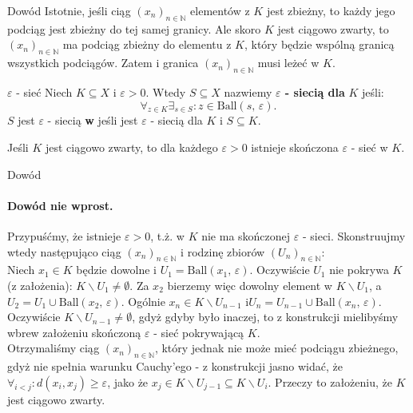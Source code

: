 \documentclass{article}
\numberwithin{defi}{section}
\numberwithin{defi}{section}
\newcommand{\N}{\mathbb{N}}
\providecommand{\eps}{\varepsilon}
\newcommand{\ciag}[1]{(#1_{n})_{n \in \N}}
\newcommand{\ball}[2]{\text{Ball}(#1, \, #2)}
\begin{document}
    \begin{dow}{Dowód}
        Istotnie, jeśli ciąg $\ciag{x}$ elementów z $K$ jest zbieżny, to każdy jego podciąg jest zbieżny do tej samej granicy. Ale skoro $K$ jest ciągowo zwarty, to $\ciag{x}$ ma podciąg zbieżny do elementu z $K$, który będzie wspólną granicą wszystkich podciągów. Zatem i granica $\ciag{x}$ musi leżeć w $K$. 
    \end{dow}


    \begin{defr}{$\eps$ - sieć} \label{defr:eps-siec}
        Niech $K \subseteq X$ i $\eps > 0$. Wtedy $S \subseteq X$ nazwiemy \textbf{$\eps$ - siecią dla} $K$ jeśli: \begin{equation}
            \forall_{z \in K} \exists_{s \in S}: z \in \ball{s}{\eps}.
        \end{equation} $S$ jest $\eps$ - siecią \textbf{w} jeśli jest $\eps$ - siecią dla $K$ i $S \subseteq K$.
    \end{defr}


    \begin{twier}{}\label{twier:sk-eps-siec}
        Jeśli $K$ jest ciągowo zwarty, to dla każdego $\eps > 0$ istnieje skończona $\eps$ - sieć w $K$.
    \end{twier}

    \begin{dow}{Dowód}
        \paragraph{Dowód nie wprost.} Przypuśćmy, że istnieje $\eps > 0$, t.ż. w $K$ nie ma skończonej $\eps$ - sieci. Skonstruujmy wtedy następująco ciąg $\ciag{x}$ i rodzinę zbiorów $\ciag{U}$:\\
         Niech $x_1 \in K$ będzie dowolne i $U_1 = \ball{x_1}{\eps}$. Oczywiście $U_1$ nie pokrywa $K$ (z założenia): $K \backslash U_1 \neq \emptyset$. Za $x_2$ bierzemy więc dowolny element w $K \backslash U_1$, a $U_2 = U_1 \cup \ball{x_2}{\eps}$. Ogólnie $x_n \in K \backslash U_{n-1}$ i$U_n = U_{n-1} \cup \ball{x_{n}}{\eps}$. Oczywiście $K \backslash U_{n-1} \neq \emptyset$, gdyż gdyby było inaczej, to z konstrukcji mielibyśmy wbrew założeniu skończoną $\eps$ - sieć pokrywającą $K$. \\
         Otrzymaliśmy ciąg $\ciag{x}$, który jednak nie może mieć podciągu zbieżnego, gdyż nie spełnia warunku Cauchy'ego - z konstrukcji jasno widać, że $\forall_{i < j}: d(x_i, x_j) \geqslant \eps$, jako że $x_j \in K \backslash U_{j-1} \subseteq K \backslash U_i$. Przeczy to założeniu, że $K$ jest ciągowo zwarty.
    \end{dow}
\end{document}
